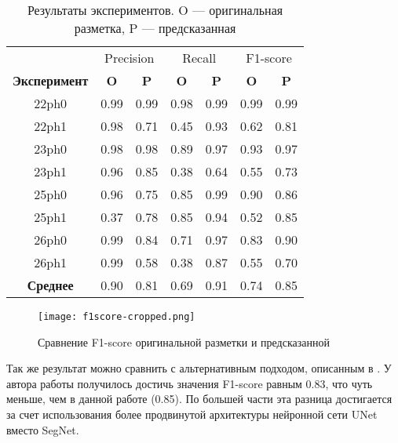 \begin{table}[ht]
	\centering
	\label{tab:results}
	\begin{tabular}{ccccccc} \toprule
		                     & \multicolumn{2}{c}{Precision} & \multicolumn{2}{c}{Recall} & \multicolumn{2}{c}{F1-score}                                        \\
		\textbf{Эксперимент} & \textbf{O}                    & \textbf{P}                 & \textbf{O}                   & \textbf{P} & \textbf{O} & \textbf{P} \\ \midrule
		22ph0                & 0.99                          & 0.99                       & 0.98                         & 0.99       & 0.99       & 0.99       \\
		22ph1                & 0.98                          & 0.71                       & 0.45                         & 0.93       & 0.62       & 0.81       \\
		23ph0                & 0.98                          & 0.98                       & 0.89                         & 0.97       & 0.93       & 0.97       \\
		23ph1                & 0.96                          & 0.85                       & 0.38                         & 0.64       & 0.55       & 0.73       \\
		25ph0                & 0.96                          & 0.75                       & 0.85                         & 0.99       & 0.90       & 0.86       \\
		25ph1                & 0.37                          & 0.78                       & 0.85                         & 0.94       & 0.52       & 0.85       \\
		26ph0                & 0.99                          & 0.84                       & 0.71                         & 0.97       & 0.83       & 0.90       \\
		26ph1                & 0.99                          & 0.58                       & 0.38                         & 0.87       & 0.55       & 0.70       \\ \midrule
		\textbf{Среднее}     & 0.90                          & 0.81                       & 0.69                         & 0.91       & 0.74       & 0.85       \\
		\bottomrule
	\end{tabular}
	\caption{\centering Результаты экспериментов. O --- оригинальная разметка, P --- предсказанная}
\end{table}

\begin{figure}[!htb]
	\centering
	\texttt{[image: f1score-cropped.png]}
	\caption{Сравнение F1-score оригинальной разметки и предсказанной}
	\label{fig:f1score-vs}
\end{figure}

Так же результат можно сравнить с альтернативным подходом, описанным в
\cite{anton}. У автора работы получилось достичь значения F1-score равным 0.83,
что чуть меньше, чем в данной работе (0.85). По большей части эта разница
достигается за счет использования более продвинутой архитектуры нейронной сети
UNet вместо SegNet.
